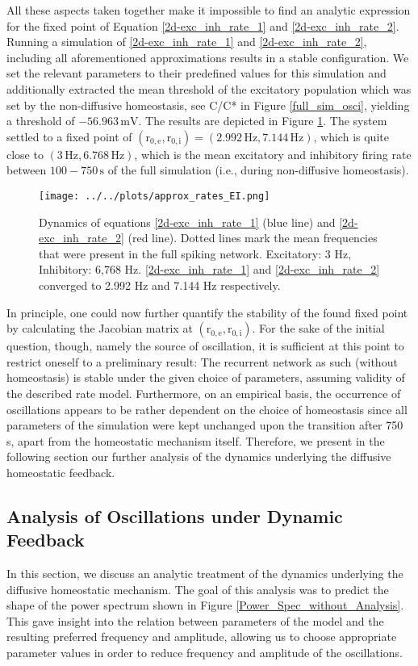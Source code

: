 \documentclass[10pt,a4paper]{article}
\begin{document}
All these aspects taken together make it impossible to find an analytic expression for the fixed point of Equation \ref{2d-exc_inh_rate_1} and \ref{2d-exc_inh_rate_2}. Running a simulation of \ref{2d-exc_inh_rate_1} and \ref{2d-exc_inh_rate_2}, including all aforementioned approximations results in a stable configuration. We set the relevant parameters to their predefined values for this simulation and additionally extracted the mean threshold of the excitatory population which was set by the non-diffusive homeostasis, see C/C* in Figure \ref{full_sim_osci}, yielding a threshold of $\mathrm{-56.963\, mV}$. The results are depicted in Figure \ref{Dyn_Rate_Approx}. The system settled to a fixed point of $\mathrm{(r_{0,e},r_{0,i}) = (2.992\, Hz, 7.144\, Hz)}$, which is quite close to $\mathrm{(3\, Hz, 6.768\, Hz)}$, which is the mean excitatory and inhibitory firing rate between $\mathrm{100-750\, s}$ of the full simulation (i.e., during non-diffusive homeostasis).
\begin{figure}
\begin{center}
\texttt{[image: ../../plots/approx\_rates\_EI.png]}
\end{center}
\caption{Dynamics of equations \ref{2d-exc_inh_rate_1} (blue line) and \ref{2d-exc_inh_rate_2} (red line). Dotted lines mark the mean frequencies that were present in the full spiking network. Excitatory: 3 Hz, Inhibitory: 6,768 Hz. \ref{2d-exc_inh_rate_1} and \ref{2d-exc_inh_rate_2} converged to 2.992 Hz and 7.144 Hz respectively.}
\label{Dyn_Rate_Approx}
\end{figure}
In principle, one could now further quantify the stability of the found fixed point by calculating the Jacobian matrix at $\mathrm{(r_{0,e},r_{0,i})}$. For the sake of the initial question, though, namely the source of oscillation, it is sufficient at this point to restrict oneself to a preliminary result: The recurrent network as such (without homeostasis) is stable under the given choice of parameters, assuming validity of the described rate model. Furthermore, on an empirical basis, the occurrence of oscillations appears to be rather dependent on the choice of homeostasis since all parameters of the simulation were kept unchanged upon the transition after 750 s, apart from the homeostatic mechanism itself. Therefore, we present in the following section our further analysis of the dynamics underlying the diffusive homeostatic feedback.

\subsection{Analysis of Oscillations under Dynamic Feedback}\label{theor_osc}
In this section, we discuss an analytic treatment of the dynamics underlying the diffusive homeostatic mechanism. The goal of this analysis was to predict the shape of the power spectrum shown in Figure \ref{Power_Spec_without_Analysis}. This gave insight into the relation between parameters of the model and the resulting preferred frequency and amplitude, allowing us to choose appropriate parameter values in order to reduce frequency and amplitude of the oscillations.
\end{document}
